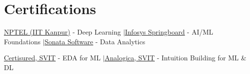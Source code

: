 \documentclass[letterpaper,9pt]{article}
\begin{document}
\section{Certifications}
\begin{itemize}[leftmargin=0.15in,label={$\bullet$},itemsep=1pt,topsep=2pt,parsep=0pt]
  \scriptsize{
    \item \href{https://drive.google.com/file/d/1Mht4NQuwqsVAj4hRFKhs-Z0vb87wFUZJ/view?usp=drivesdk}{\underline{NPTEL (IIT Kanpur)}} - Deep Learning \quad$|$\quad \href{https://drive.google.com/file/d/1BJnSHoe9wD6saVomd9q86K_-0tnUKAvn/view?usp=drivesdk}{\underline{Infosys Springboard}} - AI/ML Foundations \quad$|$\quad \href{https://drive.google.com/file/d/1q9YJYUMaPb_xKZ0VkQ2b1BIadF_1WIFK/view?usp=drivesdk}{\underline{Sonata Software}} - Data Analytics
    \item \href{https://drive.google.com/file/d/1X_fI9ExbNY_Mi4yLdW2WfBqYY-DpkDGI/view?usp=drivesdk}{\underline{Certisured, SVIT}} - EDA for ML \quad$|$\quad \href{https://drive.google.com/file/d/1hy6chmDGJucVJDgua-939Q1-E9i7D9TY/view?usp=drivesdk}{\underline{Analogica, SVIT}} - Intuition Building for ML \& DL
  }
\end{itemize}
\end{document}
